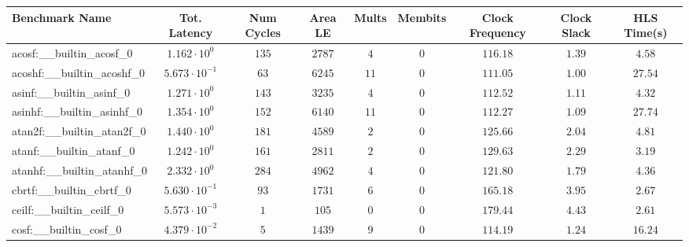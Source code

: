\begin{tabular}{|l|c|c|c|c|c|c|c|c|}
\hline
Benchmark Name                            & Tot. Latency            & Num Cycles & Area LE    & Mults   & Membits & Clock Frequency & Clock Slack & HLS Time(s) \\
\hline
acosf:\_\_builtin\_acosf\_0               & $ 1.162 \cdot 10^{0}  $ & $ 135    $ & $ 2787   $ & $ 4   $ & $ 0   $ & $ 116.18      $ & $ 1.39    $ & $ 4.58    $ \\
acoshf:\_\_builtin\_acoshf\_0             & $ 5.673 \cdot 10^{-1} $ & $ 63     $ & $ 6245   $ & $ 11  $ & $ 0   $ & $ 111.05      $ & $ 1.00    $ & $ 27.54   $ \\
asinf:\_\_builtin\_asinf\_0               & $ 1.271 \cdot 10^{0}  $ & $ 143    $ & $ 3235   $ & $ 4   $ & $ 0   $ & $ 112.52      $ & $ 1.11    $ & $ 4.32    $ \\
asinhf:\_\_builtin\_asinhf\_0             & $ 1.354 \cdot 10^{0}  $ & $ 152    $ & $ 6140   $ & $ 11  $ & $ 0   $ & $ 112.27      $ & $ 1.09    $ & $ 27.74   $ \\
atan2f:\_\_builtin\_atan2f\_0             & $ 1.440 \cdot 10^{0}  $ & $ 181    $ & $ 4589   $ & $ 2   $ & $ 0   $ & $ 125.66      $ & $ 2.04    $ & $ 4.81    $ \\
atanf:\_\_builtin\_atanf\_0               & $ 1.242 \cdot 10^{0}  $ & $ 161    $ & $ 2811   $ & $ 2   $ & $ 0   $ & $ 129.63      $ & $ 2.29    $ & $ 3.19    $ \\
atanhf:\_\_builtin\_atanhf\_0             & $ 2.332 \cdot 10^{0}  $ & $ 284    $ & $ 4962   $ & $ 4   $ & $ 0   $ & $ 121.80      $ & $ 1.79    $ & $ 4.36    $ \\
cbrtf:\_\_builtin\_cbrtf\_0               & $ 5.630 \cdot 10^{-1} $ & $ 93     $ & $ 1731   $ & $ 6   $ & $ 0   $ & $ 165.18      $ & $ 3.95    $ & $ 2.67    $ \\
ceilf:\_\_builtin\_ceilf\_0               & $ 5.573 \cdot 10^{-3} $ & $ 1      $ & $ 105    $ & $ 0   $ & $ 0   $ & $ 179.44      $ & $ 4.43    $ & $ 2.61    $ \\
cosf:\_\_builtin\_cosf\_0                 & $ 4.379 \cdot 10^{-2} $ & $ 5      $ & $ 1439   $ & $ 9   $ & $ 0   $ & $ 114.19      $ & $ 1.24    $ & $ 16.24   $ \\

\end{tabular}
